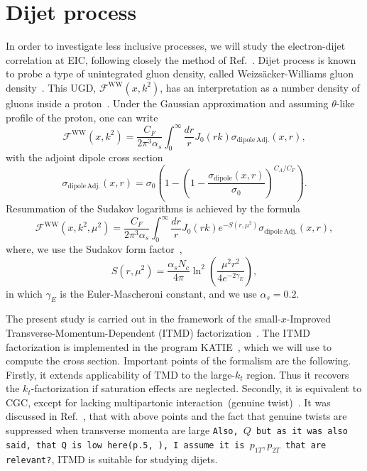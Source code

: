 \documentclass[a4,12pt]{article}
\newcommand{\fww}[0]{\mathcal{F}^{\mathrm{WW}}}
\newcommand{\sdp}[0]{\sigma_{\mathrm{dipole}}}
\newcommand{\sdpa}[0]{\sigma_{\mathrm{dipole\,Adj.}}}
\newcommand{\comment}[1]{\texttt{\color{red}#1}}
\begin{document}
\section{Dijet process}
In order to investigate less inclusive processes, we will study the electron-dijet correlation at EIC, following closely the method of Ref.~\cite{vanHameren:2021sqc}. 
Dijet process is known to probe a type of unintegrated gluon density, called Weizs\"acker-Williams gluon density~\cite{Dominguez:2010xd,Dominguez:2011wm,Xiao:2017ggh}.
This UGD, $\fww(x,k^2)$, has an interpretation as a number density of gluons inside a proton~\cite{Dominguez:2010xd,Dominguez:2011wm}. Under the Gaussian approximation and assuming $\theta$-like profile of the proton, one can write~\cite{vanHameren:2016ftb,Xiao:2017ggh,Dominguez:2010xd,Dominguez:2011wm}
\begin{equation}
\fww(x,k^2)= \frac{C_F}{2\pi^3\alpha_s}\int^\infty_0\frac{dr}{r}J_0(r k) \sdpa(x,r),
\end{equation} 	
with the adjoint dipole cross section
\begin{equation}
\sdpa(x,r)=\sigma_0\left( 1-\left(1-\frac{\sdp(x,r)}{\sigma_0}\right)^{C_A/C_F}\right).
\label{eq:ww}
\end{equation}
Resummation of the Sudakov logarithms is achieved by the formula~\cite{Xiao:2017yya}
\begin{equation}
	\fww(x,k^2,\mu^2)= \frac{C_F}{2\pi^3\alpha_s}\int^\infty_0\frac{dr}{r}J_0(r k) e^{-S(r,\mu^2)} \sdpa(x,r),
	\label{eq:ww-sud}
\end{equation}
where, we use the Sudakov form factor~\cite{Mueller:2013wwa,Xiao:2017yya},
\begin{equation}
	S(r,\mu^2)=\frac{\alpha_s N_c}{4\pi}\ln^2\left(\frac{\mu^2r^2}{4e^{-2\gamma_E}}\right),
\end{equation}
in which $\gamma_E$ is the Euler-Mascheroni constant, and we use $\alpha_s=0.2$. 
 

  
The present study is carried out in the framework of the small-$x$-Improved Transverse-Momentum-Dependent (ITMD) factorization~\cite{Kotko:2015ura,vanHameren:2016ftb}.
The ITMD factorization is implemented in the program KATIE~\cite{vanHameren:2016kkz}, which we will use to compute the cross section. Important points of the formalism are the following. Firstly, it extends applicability of TMD to the large-$k_t$ region. Thus it recovers the $k_t$-factorization if saturation effects are neglected. Secondly, it is equivalent to CGC, except for lacking multipartonic interaction~(genuine twist)~\cite{Altinoluk:2019fui}. It was discussed in Ref.~\cite{vanHameren:2021sqc}, that with above points and the fact that genuine twists are suppressed when transverse momenta are large \comment{Also, $Q$ but as it was also said, that Q is low here(p.5,\cite{vanHameren:2021sqc} ), I assume it is $p_{1T}, p_{2T}$ that are relevant?}, ITMD is suitable for studying dijets.
\end{document}
